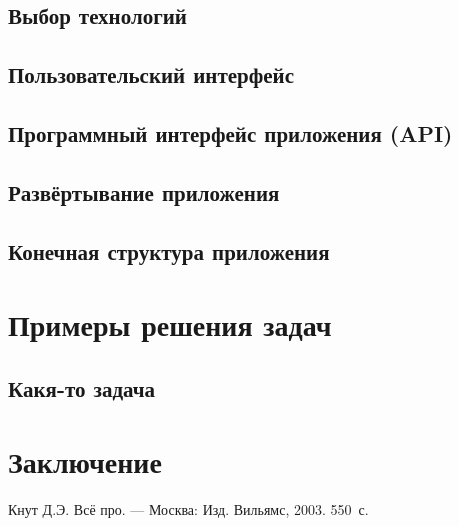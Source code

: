\documentclass[14pt,a4paper]{scrartcl}
\begin{document}
    \subsection[Выбор технологий]{Выбор технологий}
    \subsection[Пользовательский интерфейс]{Пользовательский интерфейс}
    \subsection[Программный интерфейс приложения]{Программный интерфейс приложения (API)}
    \subsection[Развёртывание приложения]{Развёртывание приложения}
    \subsection[Конечная структура приложения]{Конечная структура приложения}

    \newpage
    \section[Примеры решения задач]{Примеры решения задач}
    \subsection[Какя-то задача]{Какя-то задача}

    \newpage
    \section[Заключение]{Заключение}

    \newpage
    \begin{thebibliography}{9}
        Кнут Д.Э. Всё про. \newblock --- Москва: Изд. Вильямс, 2003. 550~с.
    \end{thebibliography}
\end{document}
